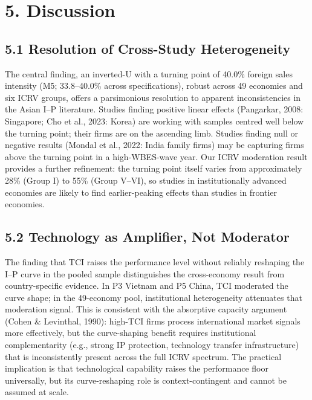 \documentclass[
  12pt]{article}
\begin{document}
\hypertarget{discussion}{%
\section{5. Discussion}\label{discussion}}

\hypertarget{resolution-of-cross-study-heterogeneity}{%
\subsection{5.1 Resolution of Cross-Study
Heterogeneity}\label{resolution-of-cross-study-heterogeneity}}

The central finding, an inverted-U with a turning point of 40.0\%
foreign sales intensity (M5; 33.8--40.0\% across specifications), robust
across 49 economies and six ICRV groups, offers a parsimonious
resolution to apparent inconsistencies in the Asian I--P literature.
Studies finding positive linear effects (Pangarkar, 2008: Singapore; Cho
et al., 2023: Korea) are working with samples centred well below the
turning point; their firms are on the ascending limb. Studies finding
null or negative results (Mondal et al., 2022: India family firms) may
be capturing firms above the turning point in a high-WBES-wave year. Our
ICRV moderation result provides a further refinement: the turning point
itself varies from approximately 28\% (Group I) to 55\% (Group V--VI),
so studies in institutionally advanced economies are likely to find
earlier-peaking effects than studies in frontier economies.

\hypertarget{technology-as-amplifier-not-moderator}{%
\subsection{5.2 Technology as Amplifier, Not
Moderator}\label{technology-as-amplifier-not-moderator}}

The finding that TCI raises the performance level without reliably
reshaping the I--P curve in the pooled sample distinguishes the
cross-economy result from country-specific evidence. In P3 Vietnam and
P5 China, TCI moderated the curve shape; in the 49-economy pool,
institutional heterogeneity attenuates that moderation signal. This is
consistent with the absorptive capacity argument (Cohen \& Levinthal,
1990): high-TCI firms process international market signals more
effectively, but the curve-shaping benefit requires institutional
complementarity (e.g., strong IP protection, technology transfer
infrastructure) that is inconsistently present across the full ICRV
spectrum. The practical implication is that technological capability
raises the performance floor universally, but its curve-reshaping role
is context-contingent and cannot be assumed at scale.
\end{document}
